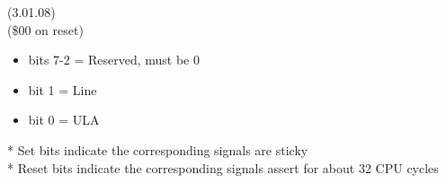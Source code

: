  (3.01.08)\\
(\$00 on reset)
\begin{itemize}
\item bits 7-2 = Reserved, must be 0
\item bit 1 = Line
\item bit 0 = ULA
\end{itemize}
* Set bits indicate the corresponding signals are sticky\\
* Reset bits indicate the corresponding signals assert for about 32 CPU cycles
